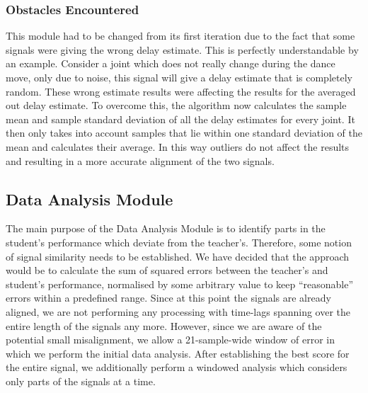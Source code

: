 \documentclass[10pt,a4paper]{article}
\begin{document}
\subsubsection{Obstacles Encountered}
\noindent
This module had to be changed from its first iteration due to the fact that some signals were giving the wrong delay estimate. This is perfectly understandable by an example. Consider a joint which does not really change during the dance move, only due to noise, this signal will give a delay estimate that is completely random. These wrong estimate results were affecting the results for the averaged out delay estimate. To overcome this, the algorithm now calculates the sample mean and sample standard deviation of all the delay estimates for every joint. It then only takes into account samples that lie within one standard deviation of the mean and calculates their average. In this way outliers do not affect the results and resulting in a more accurate alignment of the two signals.  

\subsection{Data Analysis Module}
\noindent
The main purpose of the Data Analysis Module is to identify parts in the student's performance which deviate from the teacher's. Therefore, some notion of signal similarity needs to be established. We have decided that the approach would be to calculate the sum of squared errors  between the teacher's and student's performance, normalised by some arbitrary value to keep ``reasonable'' errors within a predefined range. Since at this point the signals are already aligned, we are not performing any processing with time-lags spanning over the entire length of the signals any more. However, since we are aware of the potential small misalignment, we allow a 21-sample-wide window of error in which we perform the initial data analysis. After establishing the best score for the entire signal, we additionally perform a windowed analysis which considers only parts of the signals at a time.
\end{document}
